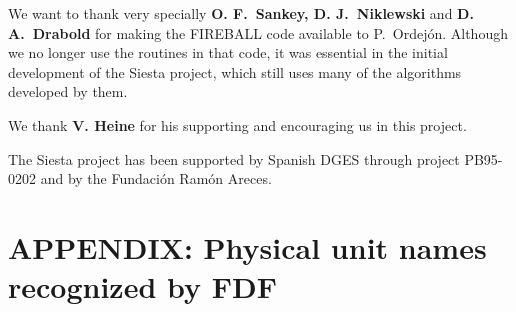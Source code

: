 \documentclass[11pt]{article}
\begin{document}
We want to thank very specially {\bf O. F.\ Sankey, D. J.\ Niklewski} and 
{\bf D. A.\ Drabold} for making the FIREBALL code available to P.\ Ordej\'on. 
Although we no longer use the routines in that code, it 
was essential in the initial development of the {\sc Siesta} project,
which still uses many of the algorithms developed by them.

We thank {\bf V. Heine} for his supporting and encouraging us in this
project. 

The {\sc Siesta} project has been supported by Spanish DGES
through project PB95-0202 and by the Fundaci\'on Ram\'on Areces.


 
\section{APPENDIX: Physical unit names recognized by FDF}
\end{document}

